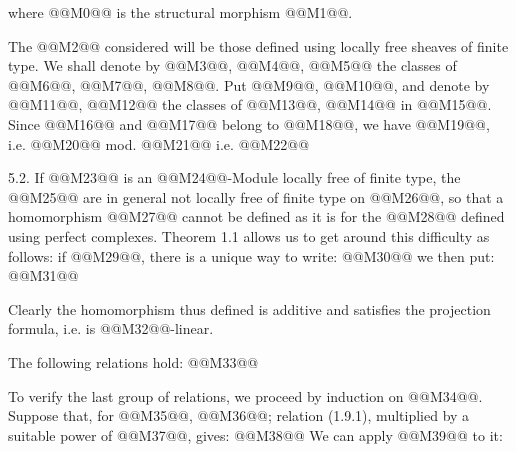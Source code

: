 where @@M0@@ is the structural morphism @@M1@@.

The @@M2@@ considered will be those defined using locally free sheaves of finite type. We shall denote by @@M3@@, @@M4@@, @@M5@@ the classes of @@M6@@, @@M7@@, @@M8@@. Put @@M9@@, @@M10@@, and denote by @@M11@@, @@M12@@ the classes of @@M13@@, @@M14@@ in @@M15@@. Since @@M16@@ and @@M17@@ belong to @@M18@@, we have @@M19@@, i.e. @@M20@@ mod. @@M21@@ i.e. @@M22@@

5.2.
If @@M23@@ is an @@M24@@-Module locally free of finite type, the @@M25@@ are in general not locally free of finite type on @@M26@@, so that a homomorphism @@M27@@ cannot be defined as it is for the @@M28@@ defined using perfect complexes. Theorem 1.1 allows us to get around this difficulty as follows: if @@M29@@, there is a unique way to write:
@@M30@@
we then put:
@@M31@@

Clearly the homomorphism thus defined is additive and satisfies the projection formula, i.e. is @@M32@@-linear.

The following relations hold:
@@M33@@

To verify the last group of relations, we proceed by induction on @@M34@@. Suppose that, for @@M35@@, @@M36@@; relation (1.9.1), multiplied by a suitable power of @@M37@@, gives:
@@M38@@
We can apply @@M39@@ to it:
